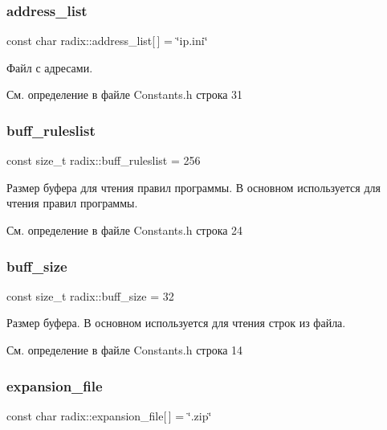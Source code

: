 \subsubsection{\texorpdfstring{address\+\_\+list}{address\_list}}
{\footnotesize\ttfamily const char radix\+::address\+\_\+list\mbox{[}$\,$\mbox{]} = \char`\"{}ip.\+ini\char`\"{}}

Файл с адресами. 

См. определение в файле Constants.\+h строка 31

\mbox{\label{namespaceradix_a8f000aabf647d34fd877c33958bad711}} 
\subsubsection{\texorpdfstring{buff\+\_\+ruleslist}{buff\_ruleslist}}
{\footnotesize\ttfamily const size\+\_\+t radix\+::buff\+\_\+ruleslist = 256}

Размер буфера для чтения правил программы. В основном используется для чтения правил программы. 

См. определение в файле Constants.\+h строка 24

\mbox{\label{namespaceradix_a82e81e89088b6430b7ec11a8a0329e9c}} 
\subsubsection{\texorpdfstring{buff\+\_\+size}{buff\_size}}
{\footnotesize\ttfamily const size\+\_\+t radix\+::buff\+\_\+size = 32}

Размер буфера. В основном используется для чтения строк из файла. 

См. определение в файле Constants.\+h строка 14

\mbox{\label{namespaceradix_a01a09f0b88f6fd375ea20667bd318035}} 
\subsubsection{\texorpdfstring{expansion\+\_\+file}{expansion\_file}}
{\footnotesize\ttfamily const char radix\+::expansion\+\_\+file\mbox{[}$\,$\mbox{]} = \char`\"{}.zip\char`\"{}}

